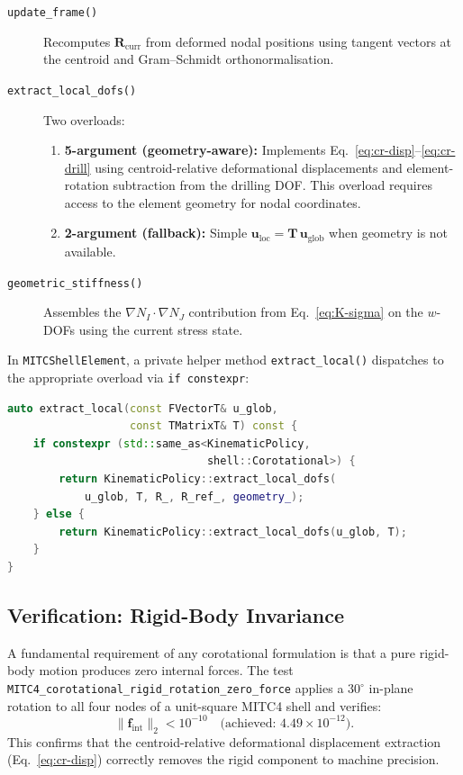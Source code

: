 \begin{description}
  \item[\texttt{update\_frame()}]
    Recomputes $\mathbf{R}_{\mathrm{curr}}$ from deformed nodal
    positions using tangent vectors at the centroid and
    Gram--Schmidt orthonormalisation.

  \item[\texttt{extract\_local\_dofs()}]
    Two overloads:
    \begin{enumerate}
      \item \textbf{5-argument (geometry-aware):} Implements
            Eq.~\eqref{eq:cr-disp}--\eqref{eq:cr-drill} using
            centroid-relative deformational displacements and
            element-rotation subtraction from the drilling DOF.
            This overload requires access to the element geometry
            for nodal coordinates.
      \item \textbf{2-argument (fallback):} Simple
            $\mathbf{u}_\mathrm{loc} = \mathbf{T}\,\mathbf{u}_\mathrm{glob}$
            when geometry is not available.
    \end{enumerate}

  \item[\texttt{geometric\_stiffness()}]
    Assembles the $\nabla N_I \cdot \nabla N_J$ contribution
    from Eq.~\eqref{eq:K-sigma} on the $w$-DOFs using the current
    stress state.
\end{description}

In \texttt{MITCShellElement}, a private helper method
\texttt{extract\_local()} dispatches to the appropriate overload
via \texttt{if constexpr}:
\begin{lstlisting}[language=C++, basicstyle=\small\ttfamily]
auto extract_local(const FVectorT& u_glob,
                   const TMatrixT& T) const {
    if constexpr (std::same_as<KinematicPolicy,
                               shell::Corotational>) {
        return KinematicPolicy::extract_local_dofs(
            u_glob, T, R_, R_ref_, geometry_);
    } else {
        return KinematicPolicy::extract_local_dofs(u_glob, T);
    }
}
\end{lstlisting}

\subsection{Verification: Rigid-Body Invariance}
\label{sec:cr-verification}

A fundamental requirement of any corotational formulation is that
a pure rigid-body motion produces zero internal forces.  The test
\texttt{MITC4\_corotational\_rigid\_rotation\_zero\_force} applies
a $30^\circ$ in-plane rotation to all four nodes of a unit-square
MITC4 shell and verifies:
\[
  \lVert \mathbf{f}_\mathrm{int} \rVert_2 < 10^{-10}
  \quad\text{(achieved: } 4.49 \times 10^{-12}\text{)}
  .
\]
This confirms that the centroid-relative deformational displacement
extraction (Eq.~\ref{eq:cr-disp}) correctly removes the rigid
component to machine precision.

